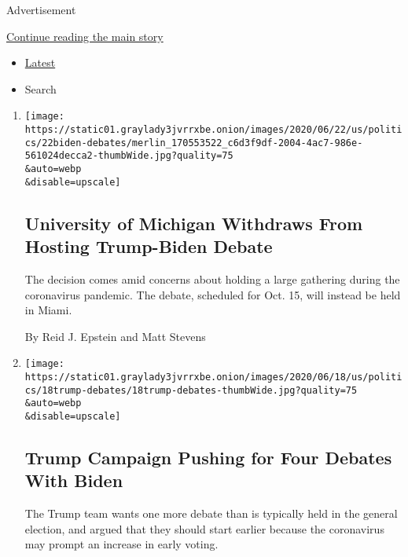 Advertisement

\protect\hyperlink{after-mid1}{Continue reading the main story}

\begin{itemize}
\tightlist
\item
  \protect\hyperlink{stream-panel}{Latest}
\item
  Search
\end{itemize}

\begin{enumerate}
\def\labelenumi{\arabic{enumi}.}
\item
  \href{/2020/06/22/us/politics/trump-vs-biden-presidential-debates.html}{}

  \texttt{[image: https://static01.graylady3jvrrxbe.onion/images/2020/06/22/us/politics/22biden-debates/merlin\_170553522\_c6d3f9df-2004-4ac7-986e-561024decca2-thumbWide.jpg?quality=75\\\&auto=webp\\\&disable=upscale]}

  \hypertarget{university-of-michigan-withdraws-from-hosting-trump-biden-debate}{%
  \subsection{University of Michigan Withdraws From Hosting Trump-Biden
  Debate}\label{university-of-michigan-withdraws-from-hosting-trump-biden-debate}}

  The decision comes amid concerns about holding a large gathering
  during the coronavirus pandemic. The debate, scheduled for Oct. 15,
  will instead be held in Miami.

  By Reid J. Epstein and Matt Stevens
\item
  \href{/2020/06/18/us/politics/trump-presidential-debates-2020.html}{}

  \texttt{[image: https://static01.graylady3jvrrxbe.onion/images/2020/06/18/us/politics/18trump-debates/18trump-debates-thumbWide.jpg?quality=75\\\&auto=webp\\\&disable=upscale]}

  \hypertarget{trump-campaign-pushing-for-four-debates-with-biden}{%
  \subsection{Trump Campaign Pushing for Four Debates With
  Biden}\label{trump-campaign-pushing-for-four-debates-with-biden}}

  The Trump team wants one more debate than is typically held in the
  general election, and argued that they should start earlier because
  the coronavirus may prompt an increase in early voting.


\end{enumerate}
